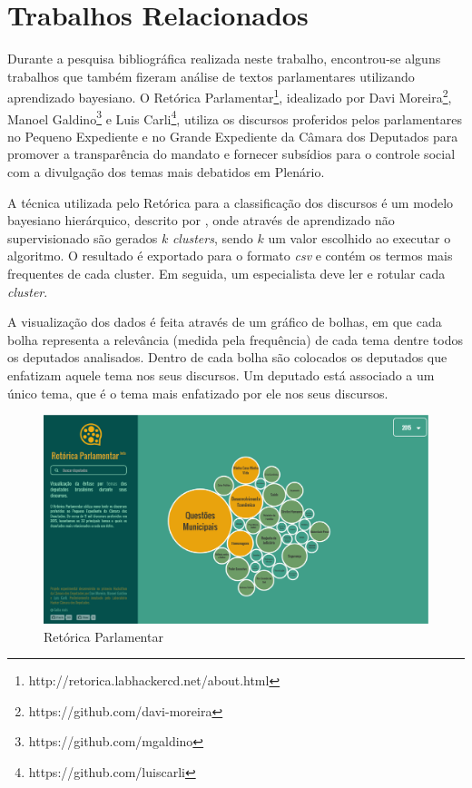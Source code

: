 \section{Trabalhos Relacionados}

Durante a pesquisa bibliográfica realizada neste trabalho, encontrou-se alguns trabalhos que também fizeram análise de textos parlamentares utilizando aprendizado bayesiano. O Retórica Parlamentar\footnote{http://retorica.labhackercd.net/about.html}, idealizado por Davi Moreira\footnote{https://github.com/davi-moreira}, Manoel Galdino\footnote{https://github.com/mgaldino} e Luis Carli\footnote{https://github.com/luiscarli}, utiliza os discursos proferidos pelos parlamentares no Pequeno Expediente e no Grande Expediente da Câmara dos Deputados para promover a transparência do mandato e fornecer subsídios para o controle social com a divulgação dos temas mais debatidos em Plenário.

A técnica utilizada pelo Retórica para a classificação dos discursos é um modelo bayesiano hierárquico, descrito por , onde através de aprendizado não supervisionado são gerados \(k\) \textit{clusters}, sendo \(k\) um valor escolhido ao executar o algoritmo. O resultado é exportado para o formato \textit{csv} e contém os termos mais frequentes de cada cluster. Em seguida, um especialista deve ler e rotular cada \textit{cluster}.

A visualização dos dados é feita através de um gráfico de bolhas, em que cada bolha representa a relevância (medida pela frequência) de cada tema dentre todos os deputados analisados. Dentro de cada bolha são colocados os deputados que enfatizam aquele tema nos seus discursos. Um deputado está associado a um único tema, que é o tema mais enfatizado por ele nos seus discursos.

\begin{figure}[h]
    \centering
    \includegraphics[scale=0.3]{figuras/retorica.eps}
    \caption{Retórica Parlamentar}
\end{figure}
